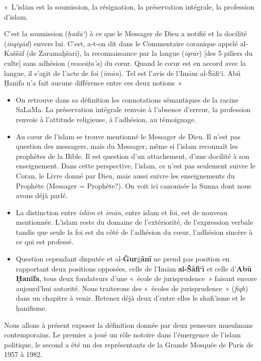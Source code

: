 \begin{Def}
«~L'islām est la soumission, la résignation, la préservation intégrale,
la profession d'islam.

C'est la soumission (\emph{ḫudū`}) à ce que le Messager de Dieu a
notifié et la docilité (\emph{inqiyād}) envers lui. C'est, a-t-on dit
dans le Commentaire coranique appelé al-Kaššāf (de Zaramaḫšarī), la
reconnaissance par la langue (\emph{iqrār}) {[}des 5 piliers du culte{]}
sans adhésion (\emph{muwāṭa'a}) du cœur. Quand le cœur est en accord
avec la langue, il s'agit de l'acte de foi (\emph{īmān}). Tel est l'avis
de l'Imām al-Šāfi`ī. Abû Ḥanīfa n'a fait aucune différence entre ces
deux notions~»
\end{Def}


\begin{itemize}
\item
  On retrouve dans sa définition les connotations sémantiques de la
  racine SaLaMa. La préservation intégrale renvoie à l'absence d'erreur,
  la profession renvoie à l'attitude religieuse, à l'adhésion, au
  témoignage.
\item
  Au cœur de l'islam se trouve mentionné le Messager de Dieu. Il n'est
  pas question des messagers, mais du Messager, même si l'islam
  reconnaît les prophètes de la Bible. Il est question d'un attachement,
  d'une docilité à son enseignement. Dans cette perspective, l'islam, ce
  n'est pas seulement suivre le Coran, le Livre donné par Dieu, mais
  aussi suivre les enseignements du Prophète (Messager = Prophète?). On
  voit ici canonisée la Sunna dont nous avons déjà parlé.
\item
  La distinction entre \emph{islām} et \emph{imān}, entre islam et foi,
  est de nouveau mentionnée. L'islam reste du domaine de l'extériorité,
  de l'expression verbale tandis que seule la foi est du côté de
  l'adhésion du cœur, l'adhésion sincère à ce qui est professé.
\item
  Question cependant disputée et al-\textbf{Ğur}ğ\textbf{ānī} ne prend
  pas position en rapportant deux positions opposées, celle de l'Imām
  \textbf{al-Šāfi`ī} et celle d'\textbf{Abū Ḥanīfa}, tous deux
  fondateurs d'une «~école de jurisprudence~» faisant encore aujourd'hui
  autorité. Nous traiterons des «~écoles de jurisprudence~»
  (\emph{fiqh}) dans un chapitre à venir. Retenez déjà deux d'entre
  elles le shafi'isme et le ḥanifisme.
\end{itemize}

Nous allons à présent exposer la définition donnée par deux penseurs
musulmans contemporains. Le premier a joué un rôle notoire dans
l'émergence de l'islam politique, le second a été un des représentants
de la Grande Mosquée de Paris de 1957 à 1982.

